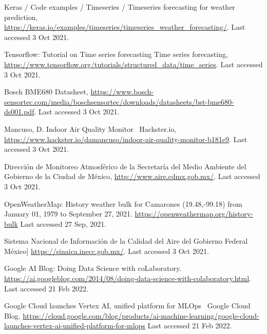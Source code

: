 \documentclass{llncs}
\begin{document}
\begin{thebibliography}{8}
    Keras / Code examples / Timeseries / Timeseries forecasting for weather prediction,
    \url{https://keras.io/examples/timeseries/timeseries_weather_forecasting/}.
    Last accessed 3 Oct 2021.
    
    Tensorflow: Tutorial on Time series forecasting Time series forecasting,
    \url{https://www.tensorflow.org/tutorials/structured_data/time_series}.
    Last accessed 3 Oct 2021.
    
    Bosch BME680 Datasheet, 
    \url{https://www.bosch-sensortec.com/media/boschsensortec/downloads/datasheets/bst-bme680-ds001.pdf}.
    Last accessed 3 Oct 2021.
    
    Mancuso, D. Indoor Air Quality Monitor \textbar\ Hackster.io,
    \url{https://www.hackster.io/damancuso/indoor-air-quality-monitor-b181e9}.
    Last accessed 3 Oct 2021.
    
    Dirección de Monitoreo Atmosférico de la Secretaría del Medio Ambiente del Gobierno de la Ciudad de México,
    \url{http://www.aire.cdmx.gob.mx/}.
    Last accessed 3 Oct 2021.
    
    OpenWeatherMap: History weather bulk for Camarones (19.48,-99.18) from January 01, 1979 to September 27, 2021.
    \url{https://openweathermap.org/history-bulk}
    Last accessed 27 Sep, 2021.
    
    Sistema Nacional de Información de la Calidad del Aire del Gobierno Federal México]
    \url{https://sinaica.inecc.gob.mx/}.
    Last accessed 3 Oct 2021.
    
    Google AI Blog: Doing Data Science with coLaboratory.
    \url{https://ai.googleblog.com/2014/08/doing-data-science-with-colaboratory.html}.
    Last accessed 21 Feb 2022.
    
    Google Cloud launches Vertex AI, unified 
    platform for MLOps \textbar\ Google Cloud Blog.
    \url{https://cloud.google.com/blog/products/ai-machine-learning/google-cloud-launches-vertex-ai-unified-platform-for-mlops}
    Last accessed 21 Feb 2022.
    
    

\end{thebibliography}
\end{document}
